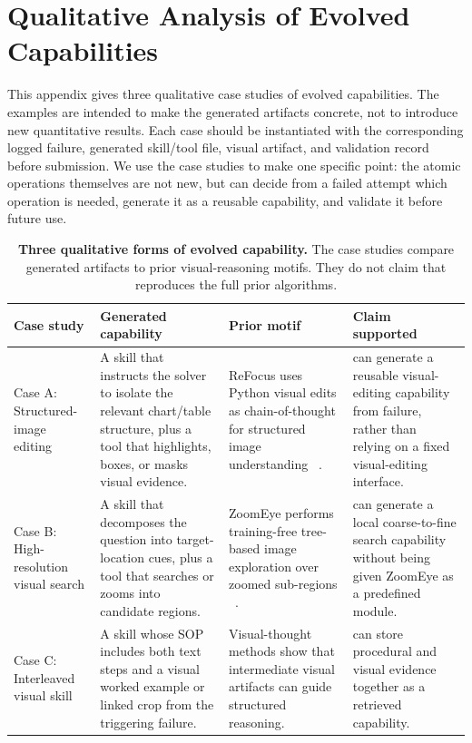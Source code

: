 \section{Qualitative Analysis of Evolved Capabilities}
\label{app:capability_cases}

This appendix gives three qualitative case studies of evolved capabilities. The examples are
intended to make the generated artifacts concrete, not to introduce new quantitative results.
Each case should be instantiated with the corresponding logged failure, generated skill/tool
file, visual artifact, and validation record before submission. We use the case studies to make
one specific point: the atomic operations themselves are not new, but \sysname{} can decide from
a failed attempt which operation is needed, generate it as a reusable capability, and validate it
before future use.

\begin{table}[t]
\centering
\small
\setlength{\tabcolsep}{4pt}
\renewcommand{\arraystretch}{1.15}
\begin{tabular}{p{}p{}p{}p{}}
\toprule
\textbf{Case study} & \textbf{Generated capability} & \textbf{Prior motif} & \textbf{Claim supported} \\
\midrule
Case A: Structured-image editing
& A skill that instructs the solver to isolate the relevant chart/table structure, plus a tool
that highlights, boxes, or masks visual evidence.
& ReFocus uses Python visual edits as chain-of-thought for structured image understanding
~\citep{DBLP:conf/icml/FuLYCLY0FZ25}.
& \sysname{} can generate a reusable visual-editing capability from failure, rather than relying
on a fixed visual-editing interface. \\
\midrule
Case B: High-resolution visual search
& A skill that decomposes the question into target-location cues, plus a tool that searches or
zooms into candidate regions.
& ZoomEye performs training-free tree-based image exploration over zoomed sub-regions
~\citep{DBLP:conf/emnlp/ShenZZXZZY25}.
& \sysname{} can generate a local coarse-to-fine search capability without being given ZoomEye as
a predefined module. \\
\midrule
Case C: Interleaved visual skill
& A skill whose SOP includes both text steps and a visual worked example or linked crop from the
triggering failure.
& Visual-thought methods show that intermediate visual artifacts can guide structured reasoning.
& \sysname{} can store procedural and visual evidence together as a retrieved capability. \\
\bottomrule
\end{tabular}
\caption{
  \textbf{Three qualitative forms of evolved capability.}
  The case studies compare generated artifacts to prior visual-reasoning motifs. They do not
  claim that \sysname{} reproduces the full prior algorithms.
}
\label{tab:capability_prior_motifs}
\end{table}

